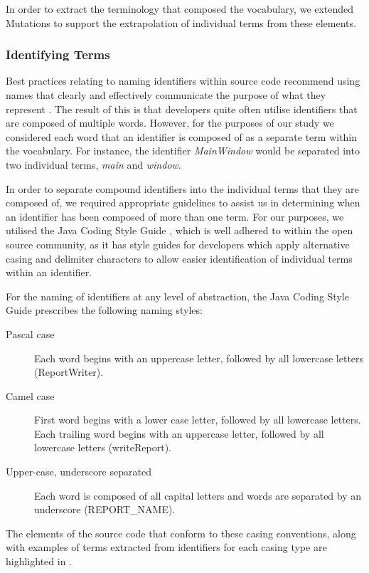 In order to extract the terminology that composed the vocabulary, we extended Mutations to support the extrapolation of individual terms from these elements.

\subsubsection{Identifying Terms} %
\label{ssub:identifying_terms}

Best practices relating to naming identifiers within source code recommend using names that clearly and effectively communicate the purpose of what they represent \cite{Reddy00a}. The result of this is that developers quite often utilise identifiers that are composed of multiple words. However, for the purposes of our study we considered each word that an identifier is composed of as a separate term within the vocabulary. For instance, the identifier \emph{MainWindow} would be separated into two individual terms, \emph{main} and \emph{window}.

In order to separate compound identifiers into the individual terms that they are composed of, we required appropriate guidelines to assist us in determining when an identifier has been composed of more than one term. For our purposes, we utilised the Java Coding Style Guide \cite{Reddy00a}, which is well adhered to within the open source community, as it has style guides for developers which apply alternative casing and delimiter characters to allow easier identification of individual terms within an identifier.

For the naming of identifiers at any level of abstraction, the Java Coding Style Guide \cite{Reddy00a} prescribes the following naming styles:

\begin{description}
	\item[Pascal case] Each word begins with an uppercase letter, followed by all lowercase letters (\eg ReportWriter).
	\item[Camel case] First word begins with a lower case letter, followed by all lowercase letters. Each trailing word begins with an uppercase letter, followed by all lowercase letters (\eg writeReport).
	\item[Upper-case, underscore separated] Each word is composed of all capital letters and words are separated by an underscore (\eg REPORT\_NAME).
\end{description}

The elements of the source code that conform to these casing conventions, along with examples of terms extracted from identifiers for each casing type are highlighted in .

